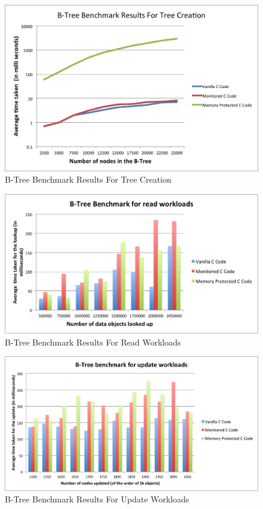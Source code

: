 \begin{figure}[!h]
\caption{B-Tree Benchmark Results For Tree Creation}
\label{fig:create}
\includegraphics[scale=0.4]{./images/create.png}
\end{figure}
\begin{figure}[!h]
\caption{B-Tree Benchmark Results For Read Workloads}
\label{fig:read}
\includegraphics[scale=0.4]{./images/read.png}
\end{figure}
\begin{figure}[!h]
\caption{B-Tree Benchmark Results For Update Workloads}
\label{fig:update}
\includegraphics[scale=0.33]{./images/update.png}
\end{figure}
  


